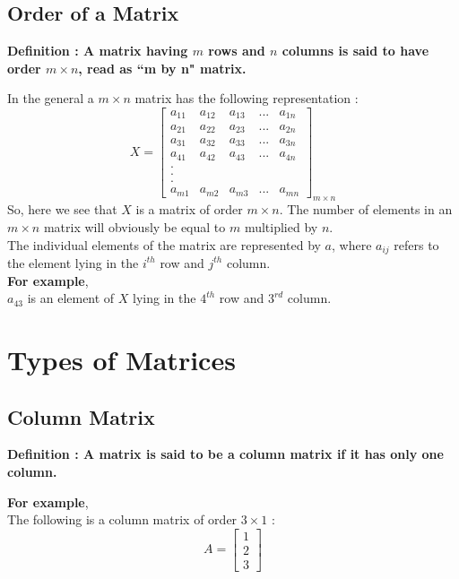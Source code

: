 \documentclass[12pt, letterpaper]{article}
\begin{document}
\subsection{Order of a Matrix}
\begin{displayquote}
\textbf{ Definition : A matrix having $m$ rows and $n$ columns is said to have order $m \times n$, read as ``m by n" matrix.}
\end{displayquote}
In the general a $m \times n$ matrix has the following representation :
\begin{displaymath}
X = \begin{bmatrix}
a_{11} & a_{12} & a_{13} & ... & a_{1n}\\
a_{21} & a_{22} & a_{23} & ... & a_{2n}\\
a_{31} & a_{32} & a_{33} & ... & a_{3n}\\
a_{41} & a_{42} & a_{43} & ... & a_{4n}\\
.\\
.\\
.\\
a_{m1} & a_{m2} & a_{m3} & ... & a_{mn}
\end{bmatrix}_{m \times n}
\end{displaymath}
So, here we see that $X$ is a matrix of order $m \times n$. The number of elements in an $m \times n$ matrix will obviously be equal to $m$ multiplied by $n$.\\
The individual elements of the matrix are represented by $a$, where $a_{ij}$ refers to the element lying in the $i^{th}$ row and $j^{th}$ column.\\
\textbf{For example}, \\
$a_{43}$ is an element of $X$ lying in the $4^{th}$ row and $3^{rd}$ column.


\section{Types of Matrices}

\subsection{Column Matrix}
\begin{displayquote}
\textbf{Definition : A matrix is said to be a column matrix if it has only one column.}
\end{displayquote}
\textbf{For example},\\
The following is a column matrix of order $3 \times 1$ : 
\begin{displaymath}
A = \begin{bmatrix}
1 \\
2 \\
3
\end{bmatrix}
\end{displaymath}
\end{document}
